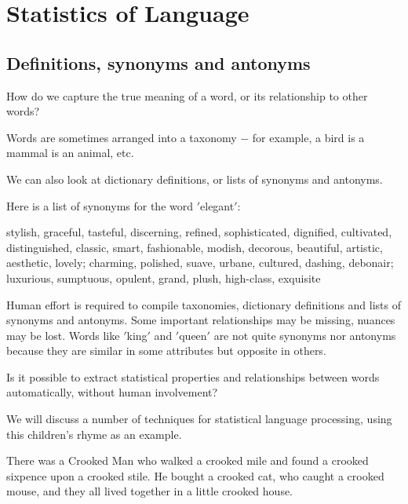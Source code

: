\documentclass[11pt]{article}
\begin{document}
\section{Statistics of Language}\label{sec:statistics-of-language}
\subsection{Definitions, synonyms and antonyms}\label{subsec:definitions-synonyms-and-antonyms}

How do we capture the true meaning of a word, or its relationship to other words?

Words are sometimes arranged into a taxonomy $-$ for example, a bird is a mammal is an animal, etc.

We can also look at dictionary definitions, or lists of synonyms and antonyms.

Here is a list of synonyms for the word \('\)elegant\('\):

    stylish, graceful, tasteful, discerning, refined, sophisticated, dignified, cultivated, distinguished, classic, smart, fashionable, modish, decorous, beautiful, artistic, aesthetic, lovely; charming, polished, suave, urbane, cultured, dashing, debonair; luxurious, sumptuous, opulent, grand, plush, high-class, exquisite

Human effort is required to compile taxonomies, dictionary definitions and lists of synonyms and antonyms.
Some important relationships may be missing, nuances may be lost.
Words like \('\)king\('\) and \('\)queen\('\) are not quite synonyms nor antonyms because they are similar in some attributes but opposite in others.

Is it possible to extract statistical properties and relationships between words automatically, without human involvement?

We will discuss a number of techniques for statistical language processing, using this children's rhyme as an example.

There was a Crooked Man who walked a crooked mile and found a crooked sixpence upon a crooked stile.
He bought a crooked cat, who caught a crooked mouse, and they all lived together in a little crooked house.
\end{document}
